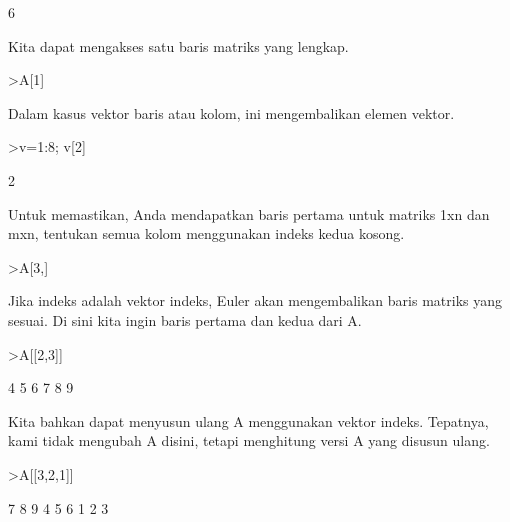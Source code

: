 \documentclass[a4paper,10pt]{article}
\begin{document}
\begin{eulernotebook}
\begin{eulercomment}
\begin{eulercomment}
\begin{eulercomment}
\begin{eulercomment}
\begin{euleroutput}
  6
\end{euleroutput}
\begin{eulercomment}
Kita dapat mengakses satu baris matriks yang lengkap.
\end{eulercomment}
\begin{eulerprompt}
>A[1]
\end{eulerprompt}
\begin{euleroutput}
  [1,  2,  3]
\end{euleroutput}
\begin{eulercomment}
Dalam kasus vektor baris atau kolom, ini mengembalikan elemen vektor.
\end{eulercomment}
\begin{eulerprompt}
>v=1:8; v[2]
\end{eulerprompt}
\begin{euleroutput}
  2
\end{euleroutput}
\begin{eulercomment}
Untuk memastikan, Anda mendapatkan baris pertama untuk matriks 1xn dan
mxn, tentukan semua kolom menggunakan indeks kedua kosong.
\end{eulercomment}
\begin{eulerprompt}
>A[3,]
\end{eulerprompt}
\begin{euleroutput}
  [7,  8,  9]
\end{euleroutput}
\begin{eulercomment}
Jika indeks adalah vektor indeks, Euler akan mengembalikan baris
matriks yang sesuai. Di sini kita ingin baris pertama dan kedua dari
A.
\end{eulercomment}
\begin{eulerprompt}
>A[[2,3]]
\end{eulerprompt}
\begin{euleroutput}
              4             5             6 
              7             8             9 
\end{euleroutput}
\begin{eulercomment}
Kita bahkan dapat menyusun ulang A menggunakan vektor indeks.
Tepatnya, kami tidak mengubah A disini, tetapi menghitung versi A yang
disusun ulang.
\end{eulercomment}
\begin{eulerprompt}
>A[[3,2,1]]
\end{eulerprompt}
\begin{euleroutput}
              7             8             9 
              4             5             6 
              1             2             3 

\end{euleroutput}
\end{eulercomment}
\end{eulercomment}
\end{eulercomment}
\end{eulercomment}
\end{eulernotebook}
\end{document}
